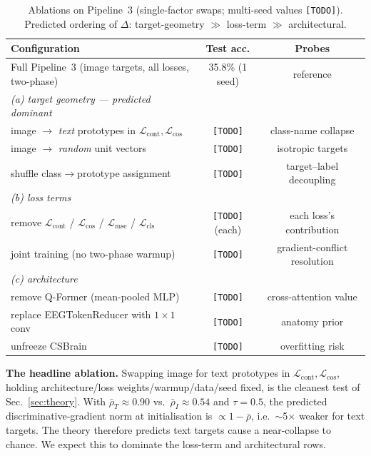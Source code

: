 \documentclass{article}
\begin{document}
\begin{table}[h]
  \centering
  \caption{Ablations on Pipeline~3 (single-factor swaps; multi-seed values \texttt{[TODO]}). Predicted ordering of $\Delta$: target-geometry $\gg$ loss-term $\gg$ architectural.}
  \label{tab:ablations}
  \footnotesize
  \begin{tabular}{lcc}
    \toprule
    \textbf{Configuration} & \textbf{Test acc.} & \textbf{Probes} \\
    \midrule
    Full Pipeline~3 (image targets, all losses, two-phase)                  & 35.8\% (1 seed)        & reference \\
    \midrule
    \emph{(a) target geometry --- predicted dominant} & & \\
    \quad image $\to$ \emph{text} prototypes in $\mathcal{L}_\mathrm{cont},\mathcal{L}_\mathrm{cos}$ & \texttt{[TODO]} & class-name collapse \\
    \quad image $\to$ \emph{random} unit vectors                                                  & \texttt{[TODO]} & isotropic targets \\
    \quad shuffle class$\to$prototype assignment                                                  & \texttt{[TODO]} & target--label decoupling \\
    \midrule
    \emph{(b) loss terms} & & \\
    \quad remove $\mathcal{L}_\mathrm{cont}$ / $\mathcal{L}_\mathrm{cos}$ / $\mathcal{L}_\mathrm{mse}$ / $\mathcal{L}_\mathrm{cls}$ & \texttt{[TODO]} (each) & each loss's contribution \\
    \quad joint training (no two-phase warmup)                                                    & \texttt{[TODO]} & gradient-conflict resolution \\
    \midrule
    \emph{(c) architecture} & & \\
    \quad remove Q-Former (mean-pooled MLP)                                                       & \texttt{[TODO]} & cross-attention value \\
    \quad replace EEGTokenReducer with $1{\times}1$ conv                                          & \texttt{[TODO]} & anatomy prior \\
    \quad unfreeze CSBrain                                                                        & \texttt{[TODO]} & overfitting risk \\
    \bottomrule
  \end{tabular}
\end{table}

\textbf{The headline ablation.} Swapping image for text prototypes in $\mathcal{L}_\mathrm{cont},\mathcal{L}_\mathrm{cos}$, holding architecture/loss weights/warmup/data/seed fixed, is the cleanest test of Sec.~\ref{sec:theory}. With $\bar{\rho}_T{\approx}0.90$ vs.\ $\bar{\rho}_I{\approx}0.54$ and $\tau{=}0.5$, the predicted discriminative-gradient norm at initialisation is $\propto 1-\bar{\rho}$, i.e.\ $\sim$5$\times$ weaker for text targets. The theory therefore predicts text targets cause a near-collapse to chance. We expect this to dominate the loss-term and architectural rows.
\end{document}
